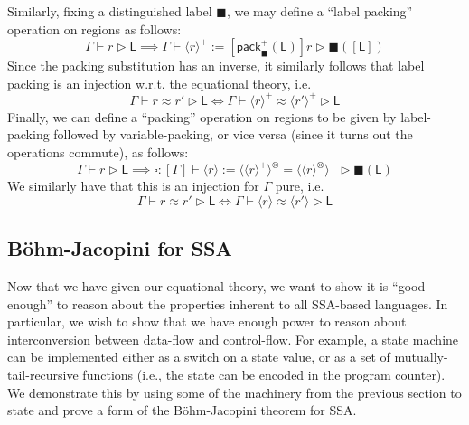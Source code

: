 \documentclass[acmsmall,screen,review]{acmart}
\newcommand{\ms}[1]{\ensuremath{\mathsf{#1}}}
\newcommand{\haslb}[3]{#1 \vdash #2 \rhd #3}
\newcommand{\teqv}{\approx}
\newcommand{\lbeq}[4]{#1 \vdash #2 \teqv #3 \rhd {#4}}
\newcommand{\invar}{\square}
\newcommand{\outlb}{\blacksquare}
\newcommand{\pckd}[1]{\langle #1 \rangle}
\begin{document}
Similarly, fixing a distinguished label $\outlb$, we may define a ``label packing'' operation on
regions as follows:
\begin{equation}
  \haslb{\Gamma}{r}{\ms{L}} \implies 
  \haslb{\Gamma}{\pckd{r}^+ := [\ms{pack}_{\outlb}^+(\ms{L})]r}{\outlb([\ms{L}])}
\end{equation}
Since the packing substitution has an inverse, it similarly follows that label packing is an
injection w.r.t. the equational theory, i.e.
\begin{equation}
  \lbeq{\Gamma}{r}{r'}{\ms{L}} \iff \lbeq{\Gamma}{\pckd{r}^+}{\pckd{r'}^+}{\ms{L}}
\end{equation}
Finally, we can define a ``packing'' operation on regions to be given by label-packing followed by
variable-packing, or vice versa (since it turns out the operations commute), as follows:
\begin{equation}
  \haslb{\Gamma}{r}{\ms{L}} \implies 
  \haslb{\invar : [\Gamma]}
    {\pckd{r} := \pckd{\pckd{r}^+}^\otimes = \pckd{\pckd{r}^\otimes}^+}
    {\outlb(\ms{L})}
\end{equation}
We similarly have that this is an injection for $\Gamma$ pure, i.e.
\begin{equation}
  \lbeq{\Gamma}{r}{r'}{\ms{L}} \iff \lbeq{\Gamma}{\pckd{r}}{\pckd{r'}}{\ms{L}}
\end{equation}


\subsection{B\"ohm-Jacopini for SSA}

\label{apx:data-control}

Now that we have given our equational theory, we want to show it is ``good enough'' to reason about
the properties inherent to all SSA-based languages. In particular, we wish to show that we have
enough power to reason about interconversion between data-flow and control-flow. For example, a
state machine can be implemented either as a switch on a state value, or as a set of
mutually-tail-recursive functions (i.e., the state can be encoded in the program counter). We
demonstrate this by using some of the machinery from the previous section to state and prove a form
of the B\"ohm-Jacopini theorem \cite{bohm-jacopini} for SSA.
\end{document}
